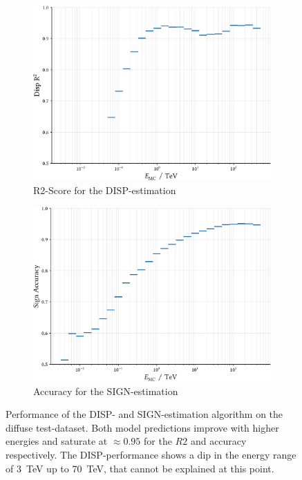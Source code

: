 \begin{figure}
    \centering
    \captionsetup{width=0.9\linewidth}
    \begin{subfigure}{0.45\textwidth}
        \includegraphics[width=\linewidth]{../analysis/plots/disp_test_r2_equal_sized.pdf} 
        \caption{R2-Score for the DISP-estimation}
    \end{subfigure}
    \begin{subfigure}{0.45\textwidth}
        \includegraphics[width=\linewidth]{../analysis/plots/disp_test_acc_equal_sized.pdf}
        \caption{Accuracy for the SIGN-estimation}
    \end{subfigure}
    \caption{
    	Performance of the DISP- and SIGN-estimation algorithm on the diffuse test-dataset.
	Both model predictions improve with higher energies and saturate
	at $\approx\num{0.95}$ for the $R2$ and accuracy respectively.
    The DISP-performance shows a dip in the energy range of \SI{3}{\tera\electronvolt}
    up to \SI{70}{\tera\electronvolt}, that cannot be explained at this point.}
    \label{fig:disp_test_perf}
\end{figure}

